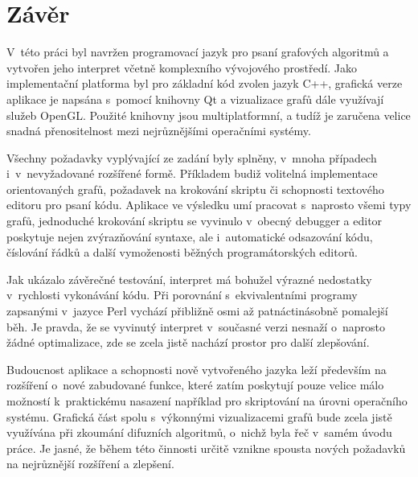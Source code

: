 \documentclass[11pt,twoside,a4paper]{book}
\begin{document}



\chapter{Závěr}


V~této práci byl navržen programovací jazyk pro psaní grafových algoritmů a vytvořen jeho interpret včetně komplexního vývojového prostředí. Jako implementační platforma byl pro základní kód zvolen jazyk C++, grafická verze aplikace je napsána s~pomocí knihovny Qt a vizualizace grafů dále využívají služeb OpenGL. Použité knihovny jsou multiplatformní, a tudíž je zaručena velice snadná přenositelnost mezi nejrůznějšími operačními systémy.

Všechny požadavky vyplývající ze zadání byly splněny, v~mnoha případech i~v~nevyžadované rozšířené formě. Příkladem budiž volitelná implementace orientovaných grafů, požadavek na krokování skriptu či schopnosti textového editoru pro psaní kódu. Aplikace ve výsledku umí pracovat s~naprosto všemi typy grafů, jednoduché krokování skriptu se vyvinulo v~obecný debugger a editor poskytuje nejen zvýrazňování syntaxe, ale i~automatické odsazování kódu, číslování řádků a další vymoženosti běžných programátorských editorů.

Jak ukázalo závěrečné testování, interpret má bohužel výrazné nedostatky v~rychlosti vykonávání kódu. Při porovnání s~ekvivalentními programy zapsanými v~jazyce Perl vychází přibližně osmi až patnáctinásobně pomalejší běh. Je pravda, že se vyvinutý interpret v~sou\-čas\-né verzi nesnaží o~naprosto žádné optimalizace, zde se zcela jistě nachází prostor pro další zlepšování.

Budoucnost aplikace a schopnosti nově vytvořeného jazyka leží především na rozšíření o~nové zabudované funkce, které zatím poskytují pouze velice málo možností k~praktickému nasazení například pro skriptování na úrovni operačního systému. Grafická část spolu s~výkonnými vizualizacemi grafů bude zcela jistě využívána při zkoumání difuzních algoritmů, o~nichž byla řeč v~samém úvodu práce. Je jasné, že během této činnosti určitě vznikne spousta nových požadavků na nejrůznější rozšíření a zlepšení.
\end{document}
